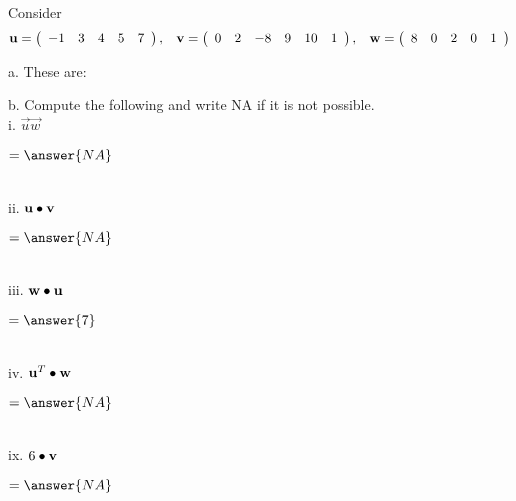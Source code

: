 \documentclass{ximera}
\author{Parisa Fatheddin}
\begin{document}
\begin{exercise}

Consider
\begin{equation*}
\vec{u} = \left(\begin{array}{ccccc} -1 & 3 & 4 & 5 & 7
\end{array}\right), \hspace{.3cm} \vec{v} = \left(\begin{array}{cccccc}
0 & 2 & -8 & 9 & 10 & 1
\end{array}\right), \hspace{.3cm} \vec{w} = \left(\begin{array}{ccccc}
8 & 0 & 2 & 0 & 1
\end{array}\right)
\end{equation*}

a. These are:
\begin{multipleChoice}
\end{multipleChoice}

b. Compute the following and write NA if it is not possible. \\

i. $\vec{u}\vec{w}$ \begin{prompt} $= \answer{NA}$\end{prompt}\\

ii. $\vec{u} \dotp \vec{v}$ \begin{prompt} $= \answer{NA}$\end{prompt}\\

iii. $\vec{w} \dotp \vec{u}$ \begin{prompt} $= \answer{7}$\end{prompt}\\

iv. $\vec{u}^{T} \dotp \vec{w}$ \begin{prompt} $= \answer{NA}$\end{prompt}\\

ix. $6\dotp \vec{v}$ \begin{prompt} $= \answer{NA} $\end{prompt}




















\end{exercise}
\end{document}
